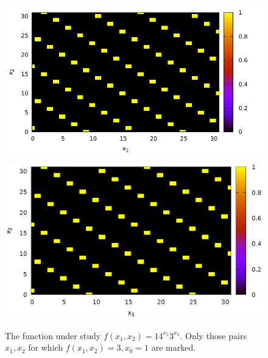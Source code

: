 \begin{figure}
\centering
\ifpdf
\includegraphics[angle=0]
{./part4/quantcomp/picdiscretlog1.pdf}
\else
\includegraphics[angle=0]
{./part4/quantcomp/picdiscretlog1.eps}
\fi

%

\caption{The function under study $f(x_1, x_2) = 14^{x_1}3^{x_2}$. Only those pairs $x_1, x_2$ for which $f(x_1, x_2) = 3, x_0 = 1$ are marked.} 
\label{fig:part4:quantcomp:dl1}
\end{figure}